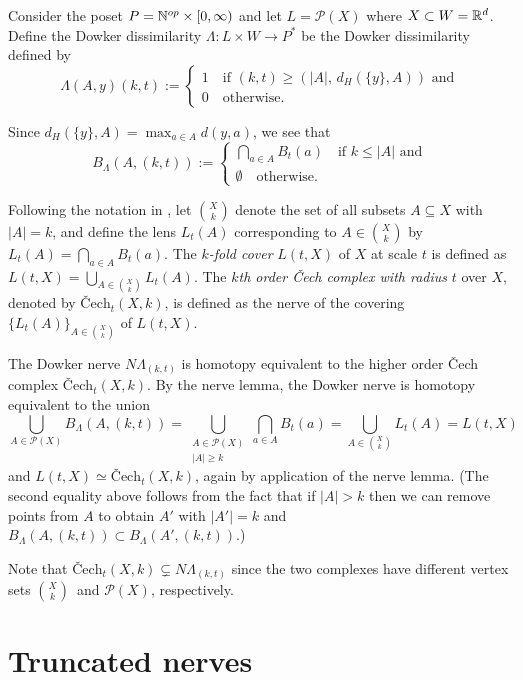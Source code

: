 \begin{ex}
	Consider the poset $P=\mathbb{N}^{op}\times[0,\infty)$ and let $L=\mathcal{P}(X)$ where $X\subset W=\mathbb{R}^d$. Define the Dowker dissimilarity $\Lambda\colon L\times W\to P^*$ be the Dowker dissimilarity defined by
	$$
	\Lambda(A,y)(k,t) := \begin{cases}
		1\quad\text{if }(k,t)\geq(|A|,\,d_H(\{y\},A))\text{ and}\\
		0\quad\text{otherwise.}
	\end{cases}
	$$
	
	Since $d_H(\{y\}, A)=\max_{a\in A}d(y,a)$, we see that
	$$
	B_\Lambda(A,(k,t)):=\begin{cases}
		\bigcap_{a\in A}B_t(a)\quad\text{if }k\leq |A| \text{ and}\\
		\emptyset\quad\text{otherwise.}
	\end{cases}
	$$
	
	Following the notation in \autocite{buchet2023sparse}, let $\binom{X}{k}$ denote the set of all subsets $A\subseteq X$ with $|A|=k$, and define the lens $L_t(A)$ corresponding to $A\in\binom{X}{k}$ by $L_t(A)=\bigcap_{a\in A}B_t(a)$. The \textit{$k$-fold cover} $L(t,X)$ of $X$ at scale $t$ is defined as $L(t,X)=\bigcup_{A\in\binom{X}{k}}L_t(A)$. The \textit{$k$th order Čech complex with radius} $t$ over $X$, denoted by $\text{\v{C}ech}_t(X,k)$, is defined as the nerve of the covering $\{L_t(A)\}_{A\in\binom{X}{k}}$ of $L(t, X)$.
	
	The Dowker nerve $N\Lambda_{(k,t)}$ is homotopy equivalent to the higher order Čech complex $\text{\v{C}ech}_t(X,k)$. By the nerve lemma, the Dowker nerve is homotopy equivalent to the union 
	$$
	\bigcup_{A\in\mathcal{P}(X)}B_\Lambda(A,(k,t)) = \bigcup_{\substack{A\in\mathcal{P}(X)\\|A|\geq k}}\bigcap_{a\in A}B_t(a) = \bigcup_{A\in\binom{X}{k}}L_t(A) = L(t,X)
	$$
	and $L(t,X)\simeq\text{\v{C}ech}_t(X,k)$, again by application of the nerve lemma. (The second equality above follows from the fact that if $|A|>k$ then we can remove points from $A$ to obtain $A'$ with $|A'|=k$ and $B_\Lambda(A,(k,t))\subset B_\Lambda(A',(k,t))$.)
	
	Note that $\text{\v{C}ech}_t(X,k)\subsetneq N\Lambda_{(k,t)}$ since the two complexes have different vertex sets $\binom{X}{k}$ and $\mathcal{P}(X)$, respectively.
\end{ex}

\section{Truncated nerves}

